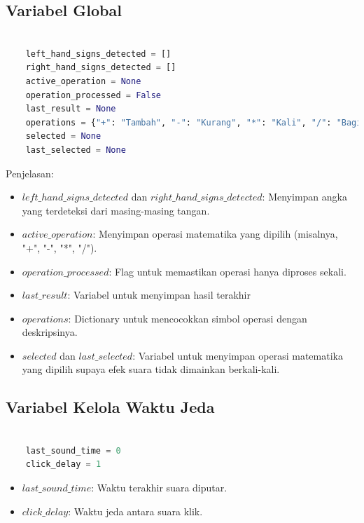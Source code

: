 \documentclass[11pt,a4paper]{article}
\begin{document}
    \subsection{Variabel Global}
    \begin{lstlisting}[language=Python, caption=Variabel Global]
    
    left_hand_signs_detected = []
    right_hand_signs_detected = []
    active_operation = None
    operation_processed = False
    last_result = None 
    operations = {"+": "Tambah", "-": "Kurang", "*": "Kali", "/": "Bagi"}
    selected = None
    last_selected = None
    \end{lstlisting}
    Penjelasan:
    \begin{itemize}
        \item $left\_hand\_signs\_detected$ dan $right\_hand\_signs\_detected$: Menyimpan angka yang terdeteksi dari masing-masing tangan.
        \item $active\_operation$: Menyimpan operasi matematika yang dipilih (misalnya, "+", "-", "*", "/").
        \item $operation\_processed$: Flag untuk memastikan operasi hanya diproses sekali.
        \item $last\_result$: Variabel untuk menyimpan hasil terakhir
        \item $operations$: Dictionary untuk mencocokkan simbol operasi dengan deskripsinya.
        \item $selected$ dan $last\_selected$: Variabel untuk menyimpan operasi matematika yang dipilih supaya efek suara tidak dimainkan berkali-kali.
    \end{itemize}

    \subsection{Variabel Kelola Waktu Jeda}
    \begin{lstlisting}[language=Python, caption=Variabel Kelola Waktu Jeda]
        
    last_sound_time = 0
    click_delay = 1
    \end{lstlisting}
    \begin{itemize}
        \item $last\_sound\_time$: Waktu terakhir suara diputar.
        \item $click\_delay$: Waktu jeda antara suara klik.
    \end{itemize}
\end{document}
